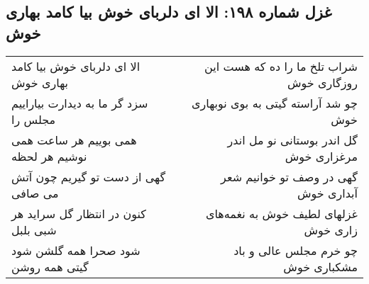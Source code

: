 \begin{center}
\section*{غزل شماره ۱۹۸: الا ای دلربای خوش بیا کامد بهاری خوش}
\label{sec:198}
\begin{longtable}{l p{0.5cm} r}
الا ای دلربای خوش بیا کامد بهاری خوش
&&
شراب تلخ ما را ده که هست این روزگاری خوش
\\
سزد گر ما به دیدارت بیاراییم مجلس را
&&
چو شد آراسته گیتی به بوی نوبهاری خوش
\\
همی بوییم هر ساعت همی نوشیم هر لحظه
&&
گل اندر بوستانی نو مل اندر مرغزاری خوش
\\
گهی از دست تو گیریم چون آتش می صافی
&&
گهی در وصف تو خوانیم شعر آبداری خوش
\\
کنون در انتظار گل سراید هر شبی بلبل
&&
غزلهای لطیف خوش به نغمه‌های زاری خوش
\\
شود صحرا همه گلشن شود گیتی همه روشن
&&
چو خرم مجلس عالی و باد مشکباری خوش
\\
\end{longtable}
\end{center}
